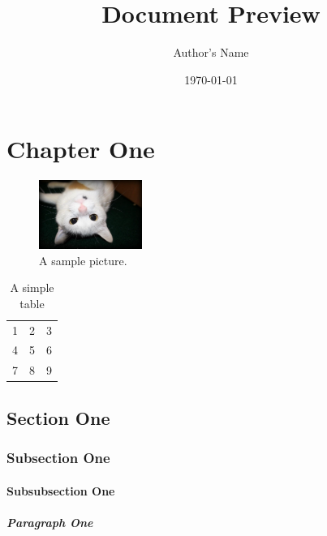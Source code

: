 \documentclass{doc}
\title{Document Preview}
\author{Author's Name}
\date{\today}
\begin{document}
\maketitle

\tableofcontents
\listoffigures
\listoftables

\begin{abstract}
\blindtext
\end{abstract}

\chapter{Chapter One}
\blindtext

\begin{figure}[ht]
	\includegraphics[width=0.3\textwidth]{myfigure}
	\caption{A sample picture.}
\end{figure}

\begin{table}[ht]
	\begin{tabular}{| l c r |}
		\hline
		1 & 2 & 3 \\
		4 & 5 & 6 \\
		7 & 8 & 9 \\
		\hline
	\end{tabular}
	\caption{A simple table}
\end{table}

\section{Section One}
\blindtext

\subsection{Subsection One}
\blindtext

\subsubsection{Subsubsection One}
\blindtext

\paragraph{Paragraph One}
\blindtext
\end{document}
